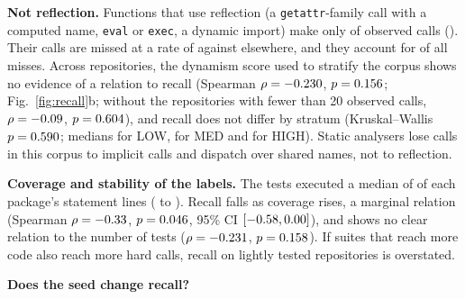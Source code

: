 {\textbf{Not reflection.} Functions that use reflection (a \texttt{getattr}-family call with a
computed name, \texttt{eval} or \texttt{exec}, a dynamic import) make only \pctReflectCalls{} of
observed calls (\nReflectCalls). Their calls are missed at a rate of  against \plainMissRate{}
elsewhere, and they account for \pctMissReflective{} of all misses. Across repositories, the
dynamism score used to stratify the corpus shows no evidence of a relation to recall (Spearman
$\rho = -0.230$, $p = 0.156$; Fig.~\ref{fig:recall}b; without the
\nSmallRepos{} repositories with fewer than 20 observed calls, $\rho = -0.09$,
$p = 0.604$), and recall does not differ by stratum (Kruskal--Wallis
$p = 0.590$; medians \edgeMedLow{} for LOW,
\edgeMedMed{} for MED and \edgeMedHigh{} for HIGH). Static analysers lose calls in this corpus to
implicit calls and dispatch over shared names, not to reflection.

\textbf{Coverage and stability of the labels.} The tests executed a median of \covMed{} of each
package's statement lines (\covMin{} to \covMax{}). Recall falls as coverage rises, a
marginal relation (Spearman $\rho = -0.33$, $p = 0.046$, 95\% CI $[-0.58, 0.00]$),
and shows no clear relation to the number of tests ($\rho = -0.231$, $p = 0.158$).
If suites that reach more code also reach more hard calls, recall on lightly tested repositories
is overstated. \retraceSentence{}

\textbf{Does the seed change recall?} \sweepRecall{}}

